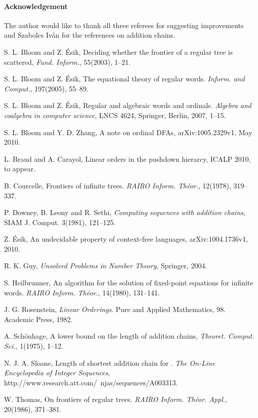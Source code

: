 \documentclass[copyright]{eptcs}
\begin{document}
\paragraph*{Acknowledgement}
The author would like to thank all three referees for suggesting improvements
and Szabolcs Iv\'an for the references on addition chains. 

\begin{thebibliography}{nn}




S. L. Bloom and  Z. \'Esik,
Deciding whether the frontier of a regular tree is scattered,
\emph{Fund. Inform.}, 55(2003), 1--21. 

S. L. Bloom and  Z. \'Esik, 
The equational theory of regular words.  
{\em Inform. and Comput.},  197(2005), 55--89.


S. L. Bloom and Z. \'Esik, 
 Regular and algebraic words and ordinals.  
{\em Algebra and coalgebra in computer science},
LNCS 4624, Springer, Berlin, 2007,  1--15. 

S. L. Bloom and  Y. D.  Zhang,
A note on ordinal DFAs, arXiv:1005.2329v1, May 2010. 

L. Braud and A. Carayol,
Linear orders in the pushdown hierarcy, ICALP 2010, to appear. 

B. Courcelle, Frontiers of infinite trees.  
{\em RAIRO Inform. Th\'eor.},  12(1978), 319--337.

P. Downey, B. Leony and R. Sethi, \emph{Computing sequences
with addition chains}, SIAM J. Comput. 3(1981),  121--125.

Z. \'Esik, An undecidable property of context-free languages,
arXiv:1004.1736v1, 2010.

R. K. Guy, \emph{Unsolved Problems in Number Theory}, Springer, 2004. 

S. Heilbrunner,  An algorithm for the solution of fixed-point equations for infinite words.  
{\em RAIRO Inform. Th\'eor.},  14(1980), 131--141.

J. G. Rosenstein, {\em Linear Orderings}. Pure and Applied Mathematics, 98. Academic Press, 
1982.

A. Sch\"onhage,  A lower bound on the length of addition chains,
\emph{Theoret. Comput. Sci.}, 1(1975), 1--12. 

N. J. A. Sloane, Length of shortest addition chain for .
\emph{ The On-Line Encyclopedia of Integer Sequences},
http://www.research.att.com/~njas/sequences/A003313.


W. Thomas, On frontiers of regular trees.  
{\em RAIRO Inform. Th\'eor. Appl.},  20(1986), 371--381.


\end{thebibliography}
\end{document}
